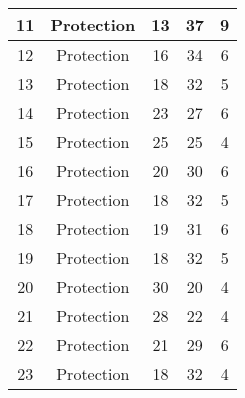 \documentclass[results.tex]{subfiles}
\begin{document}
\begin{center}
\begin{tabular}{| c || c | c | c | c |}
            \hline
            11                      & Protection                   & 13                     & 37                      & 9                    \\
            \hline
            12                      & Protection                   & 16                     & 34                      & 6                    \\
            \hline
            13                      & Protection                   & 18                     & 32                      & 5                    \\
            \hline
            14                      & Protection                   & 23                     & 27                      & 6                    \\
            \hline
            15                      & Protection                   & 25                     & 25                      & 4                    \\
            \hline
            16                      & Protection                   & 20                     & 30                      & 6                    \\
            \hline
            17                      & Protection                   & 18                     & 32                      & 5                    \\
            \hline
            18                      & Protection                   & 19                     & 31                      & 6                    \\
            \hline
            19                      & Protection                   & 18                     & 32                      & 5                    \\
            \hline
            20                      & Protection                   & 30                     & 20                      & 4                    \\
            \hline
            21                      & Protection                   & 28                     & 22                      & 4                    \\
            \hline
            22                      & Protection                   & 21                     & 29                      & 6                    \\
            \hline
            23                      & Protection                   & 18                     & 32                      & 4                    \\

\end{tabular}
\end{center}
\end{document}
